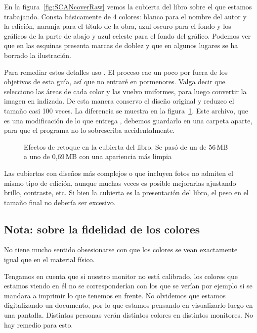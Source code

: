 \documentclass[%
	a5paper,
	10pt,
	twoside,
	openright,
	final,
]{memoir}
\begin{document}
{	En la figura~\ref{fig:SCANcoverRaw} vemos la cubierta del libro sobre el que estamos trabajando. Consta básicamente de 4 colores: blanco para el nombre del autor y la edición, naranja para el título de la obra, azul oscuro para el fondo y los gráficos de la parte de abajo y azul celeste para el fondo del gráfico. Podemos ver que en las esquinas presenta marcas de doblez y que en algunos lugares se ha borrado la ilustración.

	Para remediar estos detalles uso \gimp. El proceso cae un poco por fuera de los objetivos de esta guía, así que no entraré en pormenores. Valga decir que selecciono las áreas de cada color y las vuelvo uniformes, para luego convertir la imagen en indizada. De esta manera conservo el diseño original y reduzco el tamaño casi 100 veces. La diferencia se muestra en la figura~\ref{fig:SCANcover}. Este archivo, que es una modificación de lo que entrega \scantailor, debemos guardarlo en una carpeta aparte, para que el programa no lo sobrescriba accidentalmente.

	\begin{figure}
		\centering
		\hfill
		\caption[Efectos de retoque en la cubierta del libro]{Efectos de retoque en la cubierta del libro. Se pasó de un \tiff de 56\,MB a uno de 0,69\,MB con una apariencia más limpia\label{fig:SCANcover}}
	\end{figure}

	Las cubiertas con diseños más complejos o que incluyen fotos no admiten el mismo tipo de edición, aunque muchas veces es posible mejorarlas ajustando brillo, contraste, etc. Si bien la cubierta es la presentación del libro, el peso en el tamaño final no debería ser excesivo.

	\subsection{Nota: sobre la fidelidad de los colores} No tiene mucho sentido obsesionarse con que los colores se vean exactamente igual que en el material físico.

	Tengamos en cuenta que si nuestro monitor no está calibrado, los colores que estamos viendo en él no se corresponderían con los que se verían por ejemplo si se mandara a imprimir lo que tenemos en frente. No olvidemos que estamos digitalizando un documento, por lo que estamos pensando en visualizarlo luego en una pantalla. Distintas personas verán distintos colores en distintos monitores. No hay remedio para esto.

}
\end{document}
